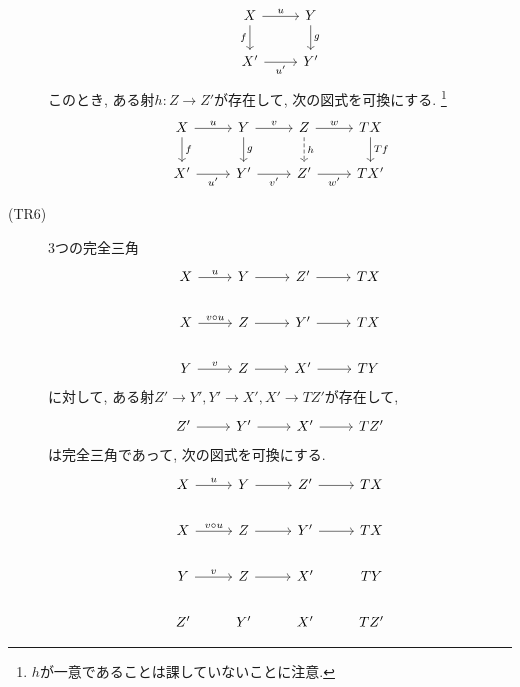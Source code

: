 \documentclass[uplatex, a4paper, 14Q, dvipdfmx]{jsarticle}
\begin{document}
\begin{definition}[三角圏]
\begin{description}
\[\begin{tikzcd}
      X & Y \\
      {X'} & {Y'}
      \arrow["u", from=1-1, to=1-2]
      \arrow["g", from=1-2, to=2-2]
      \arrow["f"', from=1-1, to=2-1]
      \arrow["{u'}"', from=2-1, to=2-2]
    \end{tikzcd}\]
    このとき, ある射$h: Z \to Z'$が存在して, 次の図式を可換にする. 
    \footnote{
      $h$が一意であることは課していないことに注意. 
    }
    \[\begin{tikzcd}
      X & Y & Z & TX \\
      {X'} & {Y'} & {Z'} & {TX'}
      \arrow["u", from=1-1, to=1-2]
      \arrow["v", from=1-2, to=1-3]
      \arrow["w", from=1-3, to=1-4]
      \arrow["f", from=1-1, to=2-1]
      \arrow["g", from=1-2, to=2-2]
      \arrow["h", dashed, from=1-3, to=2-3]
      \arrow["Tf", from=1-4, to=2-4]
      \arrow["{u'}"', from=2-1, to=2-2]
      \arrow["{v'}"', from=2-2, to=2-3]
      \arrow["{w'}"', from=2-3, to=2-4]
    \end{tikzcd}\] 
    \item[(TR6)] 3つの完全三角
    \[\begin{tikzcd}
      X & Y & {Z'} & TX \\
      X & Z & {Y'} & TX \\
      Y & Z & {X'} & TY 
      \arrow["u", from=1-1, to=1-2]
      \arrow[from=1-2, to=1-3]
      \arrow[from=1-3, to=1-4]
      \arrow[from=2-2, to=2-3]
      \arrow[from=2-3, to=2-4]
      \arrow["{v \circ u}", from=2-1, to=2-2]
      \arrow["v", from=3-1, to=3-2]
      \arrow[from=3-2, to=3-3]
      \arrow[from=3-3, to=3-4]
    \end{tikzcd}\]
    に対して, ある射$Z' \to Y', Y' \to X', X' \to TZ'$が存在して, 
    \[\begin{tikzcd}
      {Z'} & {Y'} & {X'} & {TZ'}
      \arrow[from=1-2, to=1-3]
      \arrow[from=1-1, to=1-2]
      \arrow[from=1-3, to=1-4]
    \end{tikzcd}\]
    は完全三角であって, 次の図式を可換にする. 
    \[\begin{tikzcd}
      X & Y & {Z'} & TX \\
      X & Z & {Y'} & TX \\
      Y & Z & {X'} & TY \\
      {Z'} & {Y'} & {X'} & {TZ'}
      \arrow["u", from=1-1, to=1-2]
      \arrow[from=1-2, to=1-3]
      \arrow[from=1-3, to=1-4]
      \arrow["{v \circ u}", from=2-1, to=2-2]
      \arrow[from=2-2, to=2-3]
      \arrow[from=2-3, to=2-4]
      \arrow["v", from=3-1, to=3-2]
      \arrow[from=3-2, to=3-3]

\end{tikzcd}\]
\end{description}
\end{definition}
\end{document}
